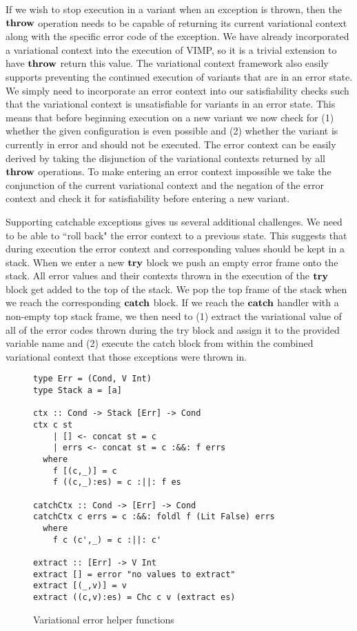 \documentclass[12pt,oneside]{book}
\begin{document}
If we wish to stop execution in a variant when an exception is thrown, then the $\textbf{\textup{\textrm{throw}}}$ operation needs to be capable of returning its current variational context
along with the specific error code of the exception. We have already incorporated a variational context into the execution of VIMP, so it is a trivial extension to have $\textbf{\textup{\textrm{throw}}}$
return this value. The variational
context framework also easily supports preventing the continued execution of variants that are in an error state. We simply need to incorporate an error context into our
satisfiability checks such that the variational context is unsatisfiable for variants in an error state. This means that before beginning execution on a new variant we now check
for (1) whether the given configuration is even possible and (2) whether the variant is currently in error and should not be executed. The error context can be easily derived
by taking the disjunction of the variational contexts returned by all $\textbf{\textup{\textrm{throw}}}$ operations. To make entering an error context impossible we take the conjunction of
the current variational context and the negation of the error context and check it for satisfiability before entering a new variant.

Supporting catchable exceptions gives us several additional challenges. We need to be able to ``roll back" the error context to a previous state. This suggests that
during execution the error context and corresponding values should be kept in a stack. When we enter a new $\textbf{\textup{\textrm{try}}}$ block we push an empty error frame onto
the stack. All error values and their contexts thrown in the execution of the $\textbf{\textup{\textrm{try}}}$ block get added to the top of the stack. We pop the top frame of the stack when
we reach the corresponding $\textbf{\textup{\textrm{catch}}}$ block. If we reach the $\textbf{\textup{\textrm{catch}}}$ handler with
a non-empty top stack frame, we then need to (1) extract the variational value of all of the error codes thrown during the try block and assign it to the provided variable name and (2) execute the catch block from within the
combined variational context that those exceptions were thrown in.

\begin{figure}
\begin{lstlisting}
type Err = (Cond, V Int)
type Stack a = [a]

ctx :: Cond -> Stack [Err] -> Cond
ctx c st
    | [] <- concat st = c
    | errs <- concat st = c :&&: f errs
  where
    f [(c,_)] = c
    f ((c,_):es) = c :||: f es
    
catchCtx :: Cond -> [Err] -> Cond
catchCtx c errs = c :&&: foldl f (Lit False) errs
  where
    f c (c',_) = c :||: c'
    
extract :: [Err] -> V Int
extract [] = error "no values to extract"
extract [(_,v)] = v
extract ((c,v):es) = Chc c v (extract es)
\end{lstlisting}
\caption{Variational error helper functions}
\label{fig:errhelpers}
\end{figure}
\end{document}
